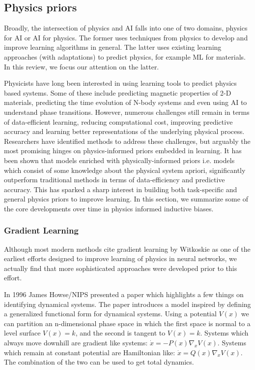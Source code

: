 \documentclass{article}
\begin{document}
\subsection{Physics priors}

Broadly, the intersection of physics and AI falls into one of two domains, physics for AI or AI for physics. The former uses techniques from physics to develop and improve learning algorithms in general. The latter uses existing learning approaches (with adaptations) to predict physics, for example ML for materials. In this review, we focus our attention on the latter.

Physicists have long been interested in using learning tools to predict physics based systems. Some of these include predicting magnetic properties of 2-D materials, predicting the time evolution of N-body systems and even using AI to understand phase transitions. However, numerous challenges still remain in terms of data-efficient learning, reducing computational cost, improving predictive accuracy and learning better representations of the underlying physical process. Researchers have identified methods to address these challenges, but arguably the most promising hinges on physics-informed priors embedded in learning. It has been shown that models enriched with physically-informed priors i.e. models which consist of some knowledge about the physical system apriori, significantly outperform traditional methods in terms of data-efficiency and predictive accuracy. This has sparked a sharp interest in building both task-specific and general physics priors to improve learning. In this section, we summarize some of the core developments over time in physics informed inductive biases. 

\subsubsection*{Gradient Learning}

Although most modern methods cite gradient learning by Witkoskie as one of the earliest efforts designed to improve learning of physics in neural networks, we actually find that more sophisticated approaches were developed prior to this effort.

In 1996 James Howse/NIPS presented a paper which highlights a few things on identifying dynamical systems. The paper introduces a model inspired by defining a generalized functional form for dynamical systems. Using a potential $V(x)$ we can partition an n-dimensional phase space in which the first space is normal to a level surface $V(x)=k$, and the second is tangent to $V(x)=k$. Systems which always move downhill are gradient like systems: $ \dot{x} = - P(x)\nabla_{x} V(x) $. Systems which remain at constant potential are Hamiltonian like: $\dot{x} = Q(x)\nabla_x V(x)$. The combination of the two can  be used to get total dynamics.
\end{document}
